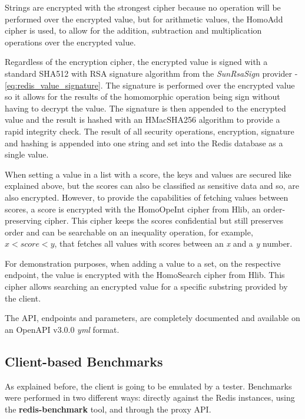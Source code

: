 Strings are encrypted with the strongest cipher because no operation will be performed over the encrypted value, but for arithmetic values, the HomoAdd cipher is used, to allow for the addition, subtraction and multiplication operations over the encrypted value.

Regardless of the encryption cipher, the encrypted value is signed with a standard SHA512 with \gls{RSA} signature algorithm from the \textit{SunRsaSign} provider - \ref{eq:redis_value_signature}. The signature is performed over the encrypted value so it allows for the results of the homomorphic operation being sign without having to decrypt the value. The signature is then appended to the encrypted value and the result is hashed with an HMacSHA256 algorithm to provide a rapid integrity check. The result of all security operations, encryption, signature and hashing is appended into one string and set into the Redis database as a single value.

When setting a value in a list with a score, the keys and values are secured like explained above, but the scores can also be classified as sensitive data and so, are also encrypted. However, to provide the capabilities of fetching values between scores, a score is encrypted with the HomoOpeInt cipher from Hlib, an order-preserving cipher. This cipher keeps the scores confidential but still preserves order and can be searchable on an inequality operation, for example, $ x < score < y $, that fetches all values with scores between an \textit{x} and a \textit{y} number.

For demonstration purposes, when adding a value to a set, on the respective endpoint, the value is encrypted with the HomoSearch cipher from Hlib. This cipher allows searching an encrypted value for a specific substring provided by the client.

The \gls{API}, endpoints and parameters, are completely documented and available on an OpenAPI v3.0.0 \textit{yml} format.

\subsection{Client-based Benchmarks}
\label{ssec:client_based_benchmarks}

As explained before, the client is going to be emulated by a tester. Benchmarks were performed in two different ways: directly against the Redis instances, using the \textbf{redis-benchmark} \cite{redis_benchmark_cli:1} tool, and through the proxy \gls{API}.

